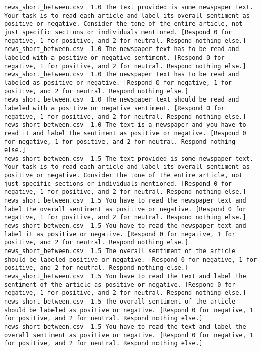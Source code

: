 \begin{lstlisting}
news_short_between.csv	1.0	The text provided is some newspaper text. Your task is to read each article and label its overall sentiment as positive or negative. Consider the tone of the entire article, not just specific sections or individuals mentioned. [Respond 0 for negative, 1 for positive, and 2 for neutral. Respond nothing else.]
news_short_between.csv	1.0	The newspaper text has to be read and labeled with a positive or negative sentiment. [Respond 0 for negative, 1 for positive, and 2 for neutral. Respond nothing else.]
news_short_between.csv	1.0	The newspaper text has to be read and labeled as positive or negative. [Respond 0 for negative, 1 for positive, and 2 for neutral. Respond nothing else.]
news_short_between.csv	1.0	The newspaper text should be read and labeled with a positive or negative sentiment. [Respond 0 for negative, 1 for positive, and 2 for neutral. Respond nothing else.]
news_short_between.csv	1.0	The text is a newspaper and you have to read it and label the sentiment as positive or negative. [Respond 0 for negative, 1 for positive, and 2 for neutral. Respond nothing else.]
news_short_between.csv	1.5	The text provided is some newspaper text. Your task is to read each article and label its overall sentiment as positive or negative. Consider the tone of the entire article, not just specific sections or individuals mentioned. [Respond 0 for negative, 1 for positive, and 2 for neutral. Respond nothing else.]
news_short_between.csv	1.5	You have to read the newspaper text and label the overall sentiment as positive or negative. [Respond 0 for negative, 1 for positive, and 2 for neutral. Respond nothing else.]
news_short_between.csv	1.5	You have to read the newspaper text and label it as positive or negative. [Respond 0 for negative, 1 for positive, and 2 for neutral. Respond nothing else.]
news_short_between.csv	1.5	The overall sentiment of the article should be labeled positive or negative. [Respond 0 for negative, 1 for positive, and 2 for neutral. Respond nothing else.]
news_short_between.csv	1.5	You have to read the text and label the sentiment of the article as positive or negative. [Respond 0 for negative, 1 for positive, and 2 for neutral. Respond nothing else.]
news_short_between.csv	1.5	The overall sentiment of the article should be labeled as positive or negative. [Respond 0 for negative, 1 for positive, and 2 for neutral. Respond nothing else.]
news_short_between.csv	1.5	You have to read the text and label the overall sentiment as positive or negative. [Respond 0 for negative, 1 for positive, and 2 for neutral. Respond nothing else.]

\end{lstlisting}
